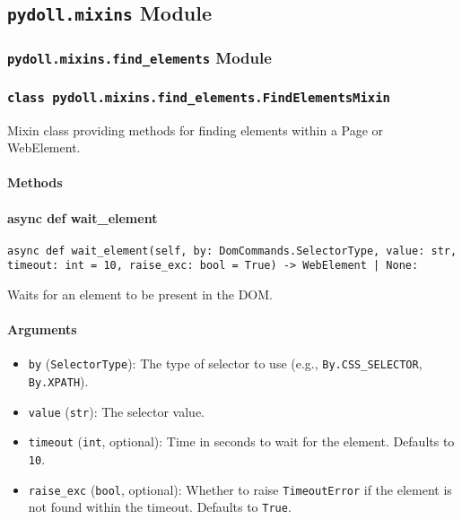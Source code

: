 \documentclass{article}
\begin{document}
\hrulefill

\subsection*{\texttt{pydoll.mixins} Module}

\subsubsection*{\texttt{pydoll.mixins.find\_elements} Module}

\subsubsection*{\texttt{class pydoll.mixins.find\_elements.FindElementsMixin}}
\noindent Mixin class providing methods for finding elements within a Page or WebElement.

\paragraph{Methods}
\paragraph{async def wait\_element}

\begin{lstlisting}[style=pythonstyle]
async def wait_element(self, by: DomCommands.SelectorType, value: str, timeout: int = 10, raise_exc: bool = True) -> WebElement | None:
\end{lstlisting}

\noindent Waits for an element to be present in the DOM.

\paragraph{Arguments}

\begin{itemize}
    \item \lstinline[style=pythonstyle]|by| (\lstinline[style=pythonstyle]|SelectorType|): The type of selector to use (e.g., \lstinline[style=pythonstyle]|By.CSS_SELECTOR|, \lstinline[style=pythonstyle]|By.XPATH|).
    \item \lstinline[style=pythonstyle]|value| (\lstinline[style=pythonstyle]|str|): The selector value.
    \item \lstinline[style=pythonstyle]|timeout| (\lstinline[style=pythonstyle]|int|, optional): Time in seconds to wait for the element. Defaults to \lstinline[style=pythonstyle]|10|.
    \item \lstinline[style=pythonstyle]|raise_exc| (\lstinline[style=pythonstyle]|bool|, optional): Whether to raise \lstinline[style=pythonstyle]|TimeoutError| if the element is not found within the timeout. Defaults to \lstinline[style=pythonstyle]|True|.
\end{itemize}
\end{document}
